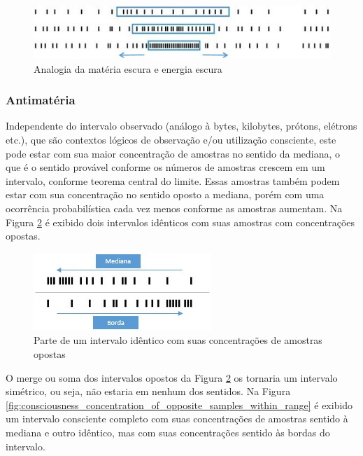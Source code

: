 \begin{figure}[H]
\caption{Analogia da matéria escura e energia escura}
\label{fig:consciousness_dark_matter_dark_energy}
\centering
\includegraphics[scale=1]{sections/images/consciousness_dark_matter_dark_energy.jpg}
\end{figure}

\subsubsection{Antimatéria}
Independente do intervalo observado (análogo à bytes, kilobytes, prótons, elétrons etc.), que são contextos lógicos de observação e/ou utilização consciente, este pode estar com sua maior concentração de amostras no sentido da mediana, o que é o sentido provável conforme os números de amostras crescem em um intervalo, conforme teorema central do limite. Essas amostras também podem estar com sua concentração no sentido oposto a mediana, porém com uma ocorrência probabilística cada vez menos conforme as amostras aumentam. Na Figura \ref{fig:consciousness_concentration_of_opposite_samples} é exibido dois intervalos idênticos com suas amostras com concentrações opostas.

\begin{figure}[H]
\caption{Parte de um intervalo idêntico com suas concentrações de amostras opostas}
\label{fig:consciousness_concentration_of_opposite_samples}
\centering
\includegraphics[scale=1]{sections/images/consciousness_concentration_of_opposite_samples.jpg}
\end{figure}

O merge ou soma dos intervalos opostos da Figura \ref{fig:consciousness_concentration_of_opposite_samples} os tornaria um intervalo simétrico, ou seja, não estaria em nenhum dos sentidos.
Na Figura \ref{fig:consciousness_concentration_of_opposite_samples_within_range} é exibido um intervalo consciente completo com suas concentrações de amostras sentido à mediana e outro idêntico, mas com suas concentrações sentido às bordas do intervalo.


